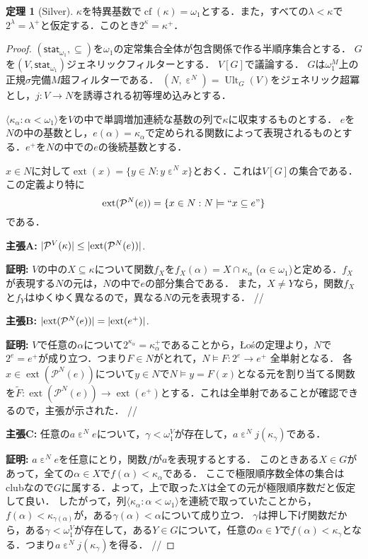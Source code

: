 \documentclass[uplatex]{jsarticle}
\newcommand{\Pow}{\mathcal{P}}
\newcommand{\cf}{\operatorname{cf}}
\newcommand{\Ult}{\operatorname{Ult}}
\newcommand{\ext}{\operatorname{ext}}
\newcommand{\statone}{\mathsf{stat}_{\omega_1}}
\newcommand{\seq}[1]{{\langle#1\rangle}}
\DeclarePairedDelimiter\abs{\lvert}{\rvert}
\renewcommand\subset{\subseteq}
\theoremstyle{definition}
\newtheorem{thm}{定理}[section]
\begin{document}
	\begin{thm}[Silver]
		$\kappa$を特異基数で$\cf(\kappa) = \omega_1$とする．また，すべての$\lambda < \kappa$で$2^\lambda = \lambda^+$と仮定する．このとき$2^\kappa = \kappa^+$．
	\end{thm}
	\begin{proof}
		$(\statone, \subset)$を$\omega_1$の定常集合全体が包含関係で作る半順序集合とする．
		$G$を$(V, \statone)$ジェネリックフィルターとする．
		$V[G]$で議論する．
		$G$は$\omega_1^M$上の正規$\sigma$完備$M$超フィルターである．
		$(N, \mathrel{\varepsilon}^N) = \Ult_G(V)$をジェネリック超冪とし，$j \colon V \to N$を誘導される初等埋め込みとする．
		
		$\seq{\kappa_\alpha : \alpha < \omega_1}$を$V$の中で単調増加連続な基数の列で$\kappa$に収束するものとする．
		$e$を$N$の中の基数とし，$e(\alpha) = \kappa_\alpha$で定められる関数によって表現されるものとする．$e^+$を$N$の中での$e$の後続基数とする．
		
		$x \in N$に対して$\ext(x) = \{ y \in N : y \mathrel{\varepsilon}^N x \}$とおく．これは$V[G]$の集合である．
		この定義より特に
		\[
		\ext(\Pow^N(e)) = \{ x \in N : N \models ``x \subset e" \}
		\]
		である．
		
		\par \textbf{主張A: } $\abs{\Pow^V(\kappa)} \le \abs{\ext(\Pow^N(e))}$.
		\par \textbf{証明: } $V$の中の$X \subset \kappa$について関数$f_X$を$f_X(\alpha) = X \cap \kappa_\alpha$ ($\alpha \in \omega_1$)と定める．$f_X$が表現する$N$の元は，$N$の中で$e$の部分集合である．
		また，$X \ne Y$なら，関数$f_X$と$f_Y$はゆくゆく異なるので，異なる$N$の元を表現する． \hfill //
		
		\par \textbf{主張B: } $\abs{\ext(\Pow^N(e))} = \abs{\ext(e^+)}$.
		\par \textbf{証明: } $V$で任意の$\alpha$について$2^{\kappa_\alpha} = \kappa_\alpha^+$であることから，Łośの定理より，$N$で$2^e = e^+$が成り立つ．つまり$F \in N$がとれて，$N \models F \colon 2^e \to e^+ \text{ 全単射}$となる．
		各$x \in \ext(\Pow^N(e))$について$y \in N$で$N \models y = F(x)$となる元を割り当てる関数を$\tilde{F} \colon \ext(\Pow^N(e)) \to \ext(e^+)$とする．これは全単射であることが確認できるので，主張が示された． \hfill //
		
		\par \textbf{主張C: } 任意の$a \mathrel{\varepsilon}^N e$について，$\gamma < \omega_1^V$が存在して，$a \mathrel{\varepsilon}^N j(\kappa_\gamma)$である．
		\par \textbf{証明: } $a \mathrel{\varepsilon}^N e$を任意にとり，関数$f$が$a$を表現するとする．
		このときある$X \in G$があって，全ての$\alpha \in X$で$f(\alpha) < \kappa_\alpha$である．
		ここで極限順序数全体の集合はclubなので$G$に属する．よって，上で取った$X$は全ての元が極限順序数だと仮定して良い．
		したがって，列$\seq{\kappa_\alpha : \alpha < \omega_1}$を連続で取っていたことから，$f(\alpha) < \kappa_{\gamma(\alpha)}$が，ある$\gamma(\alpha) < \alpha$について成り立つ．
		$\gamma$は押し下げ関数だから，ある$\gamma < \omega_1^V$が存在して，ある$Y \in G$について，任意の$\alpha \in Y$で$f(\alpha) < \kappa_\gamma$となる．つまり$a \mathrel{\varepsilon}^N j(\kappa_\gamma)$を得る． \hfill //
		

\end{proof}
\end{document}
